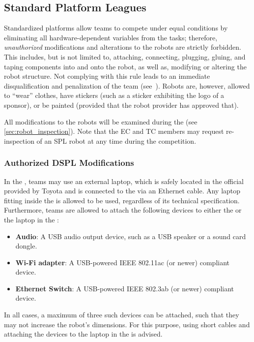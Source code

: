 \subsection{Standard Platform Leagues}

Standardized platforms allow teams to compete under equal conditions by eliminating all hardware-dependent variables from the tasks; therefore, \emph{unauthorized} modifications and alterations to the robots are strictly forbidden.
This includes, but is not limited to, attaching, connecting, plugging, gluing, and taping components into and onto the robot, as well as, modifying or altering the robot structure.
Not complying with this rule leads to an immediate disqualification and penalization of the team (see~).
Robots are, however, allowed to \enquote{wear} clothes, have stickers (such as a sticker exhibiting the logo of a sponsor), or be painted (provided that the robot provider has approved that).

All modifications to the robots will be examined during the \RobotInspection{} (see \ref{sec:robot_inspection}).
Note that the EC and TC members may request re-inspection of an SPL robot at any time during the competition.

\subsubsection{Authorized DSPL Modifications}
\label{rule:osl_dspl}

In the \DSPL{}, teams may use an external laptop, which is safely located in the official \MountingBracket{} provided by Toyota and is connected to the \HSR{} via an Ethernet cable.
Any laptop fitting inside the \MountingBracket{} is allowed to be used, regardless of its technical specification.
Furthermore, teams are allowed to attach the following devices to either the \HSR{} or the laptop in the \MountingBracket:
\begin{itemize}
	\item \textbf{Audio}: A USB audio output device, such as a USB speaker or a sound card dongle.
	\item \textbf{Wi-Fi adapter}: A USB-powered IEEE 802.11ac (or newer) compliant device.
	\item \textbf{Ethernet Switch}: A USB-powered IEEE 802.3ab (or newer) compliant device.
\end{itemize}
In all cases, a maximum of three such devices can be attached, such that they may not increase the robot's dimensions.
For this purpose, using short cables and attaching the devices to the laptop in the \MountingBracket{} is advised.

